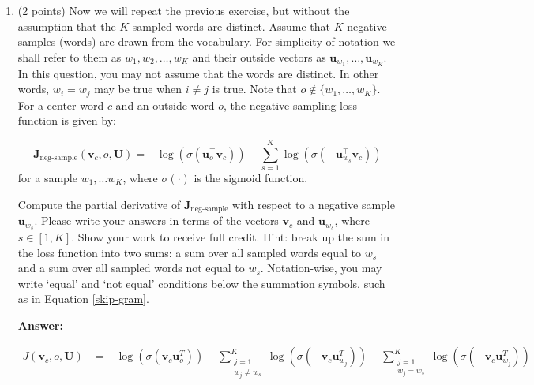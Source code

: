 \documentclass{article}
\newenvironment{answer}{
    {\bf Answer:} \sf \begingroup\color{red}
}{\endgroup}%
\begin{document}
\begin{enumerate}[label=(\alph*)]
\begin{shaded}
\begin{answer}
\end{answer}
\end{shaded}

\item (2 points) Now we will repeat the previous exercise, but without the assumption that the $K$ sampled words are distinct.  Assume that $K$ negative samples (words) are drawn from the vocabulary. For simplicity of notation we shall refer to them as $w_1, w_2, \dots, w_K$ and their outside vectors as $\bm u_{w_1}, \dots, \bm u_{w_K}$. In this question, you may not assume that the words are distinct. In other words, $w_i=w_j$ may be true when $i\neq j$ is true.
Note that $o\notin\{w_1, \dots, w_K\}$. 
For a center word $c$ and an outside word $o$, the negative sampling loss function is given by:

\begin{equation}
\bm J_{\text{neg-sample}}(\bm v_c, o, \bm U) = -\log(\sigma(\bm u_o^\top \bm v_c)) - \sum_{s=1}^K \log(\sigma(-\bm u_{w_s}^\top \bm v_c))
\end{equation}
for a sample $w_1, \ldots w_K$, where $\sigma(\cdot)$ is the sigmoid function.

Compute the partial derivative of $\bm J_{\text{neg-sample}}$ with respect to a negative sample $\bm u_{w_s}$. Please write your answers in terms of the vectors $\bm v_c$ and $\bm u_{w_s}$, where $s \in [1, K]$. Show your work to receive full credit. Hint: break up the sum in the loss function into two sums: a sum over all sampled words equal to $w_s$ and a sum over all sampled words not equal to $w_s$. Notation-wise, you may write `equal' and `not equal' conditions below the summation symbols, such as in Equation \ref{skip-gram}.

\begin{shaded}
\begin{answer}

    \begin{equation}
        \begin{align}
            J(\mathbf{v}_c,o,\bm U) &= -\log\left(\sigma(\bm v_c\bm u_o^T)\right) - \sum_{\substack{j=1\\w_j\neq w_s}}^K\log\left( \sigma(-\bm v_c\bm u_{w_j}^T) \right) - \sum_{\substack{j=1\\w_j= w_s}}^K\log\left( \sigma(-\bm v_c\bm u_{w_j}^T) \right)
        \end{align}\label{eq:1h1}
    \end{equation}


\end{answer}
\end{shaded}
\end{enumerate}
\end{document}
